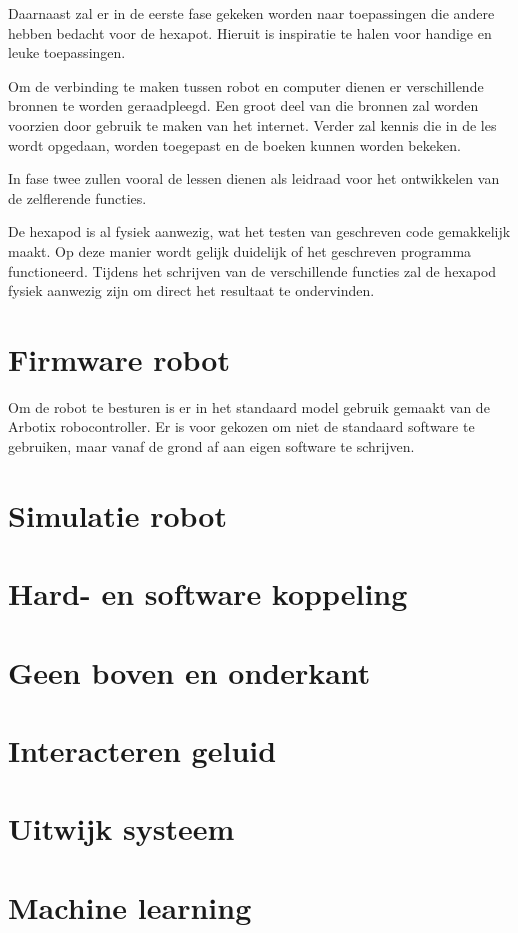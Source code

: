 \documentclass[10pt,a4paper]{article}
\begin{document}
Daarnaast zal er in de eerste fase gekeken worden naar toepassingen die andere hebben bedacht voor de hexapot. Hieruit is inspiratie te halen voor handige en leuke toepassingen.

Om de verbinding te maken tussen robot en computer dienen er verschillende bronnen te worden geraadpleegd. Een groot deel van die bronnen zal worden voorzien door gebruik te maken van het internet. Verder zal kennis die in de les wordt opgedaan, worden toegepast en de boeken kunnen worden bekeken.

In fase twee zullen vooral de lessen dienen als leidraad voor het ontwikkelen van de zelflerende functies.

De hexapod is al fysiek aanwezig, wat het testen van geschreven code gemakkelijk maakt. Op deze manier wordt gelijk duidelijk of het geschreven programma functioneerd. Tijdens het schrijven van de verschillende functies zal de hexapod fysiek aanwezig zijn om direct het resultaat te ondervinden.



\section{Firmware robot}
Om de robot te besturen is er in het standaard model gebruik gemaakt van de Arbotix robocontroller. 
Er is voor gekozen om niet de standaard software te gebruiken, maar vanaf de grond af aan eigen software te schrijven.

\section{Simulatie robot}
\section{Hard- en software koppeling}
\section{Geen boven en onderkant}
\section{Interacteren geluid}
\section{Uitwijk systeem}
\section{Machine learning}
\end{document}
